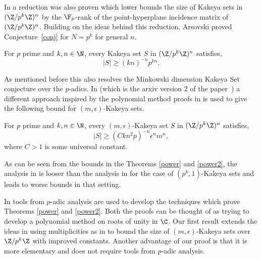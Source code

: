 In \cite{dhar2021proof} a reduction was also proven which lower bounds the size of Kakeya sets in $(\Z/p^k\Z)^n$ by the $\F_p$-rank of the point-hyperplane incidence matrix of $(\Z/p^k\Z)^n$. Building on the ideas behind this reduction, Arsovski proved Conjecture~\ref{conj} for $N=p^k$ for general $n$.

\begin{thm}\label{power}
For $p$ prime and $k,n\in \N$, every Kakeya set $S$ in $(\Z/p^k\Z)^n$ satisfies,
$$|S|\ge (kn)^{-n} p^{kn}.$$
\end{thm}

As mentioned before this also resolves the Minkowski dimension Kakeya Set conjecture over the $p$-adics. In \cite{arsovskiNew} (which is the arxiv version 2 of the paper~\cite{arsovski2021padic}) a different approach inspired by the polynomial method proofs in \cite{dvir2009size,saraf2008,dvir2013extensions} is used to give the following bound for $(m,\epsilon)$-Kakeya sets.

\begin{thm}\label{power2}
For $p$ prime and $k,n\in \N$, every $(m,\epsilon)$-Kakeya set $S$ in $(\Z/p^k\Z)^n$ satisfies,
$$|S|\ge (Ckn^2p)^{-n}\epsilon^n m^{n},$$
where $C>1$ is some universal constant.
\end{thm}

As can be seen from the bounds in the Theorems \ref{power} and \ref{power2}, the analysis in \cite{arsovskiNew} is looser than the analysis in \cite{arsovski2021padic} for the case of $(p^k,1)$-Kakeya sets and leads to worse bounds in that setting.


In \cite{arsovski2021padic,arsovskiNew} tools from $p$-adic analysis are used to develop the techniques which prove Theorems \ref{power} and \ref{power2}. Both the proofs can be thought of as trying to develop a polynomial method on roots of unity in $\C$. Our first result extends the ideas in \cite{arsovski2021padic} using multiplicities as in \cite{saraf2008,dvir2013extensions} to bound the size of $(m,\epsilon)$-Kakeya sets over $\Z/p^k\Z$ with improved constants. Another advantage of our proof is that it is more elementary and does not require tools from $p$-adic analysis.

